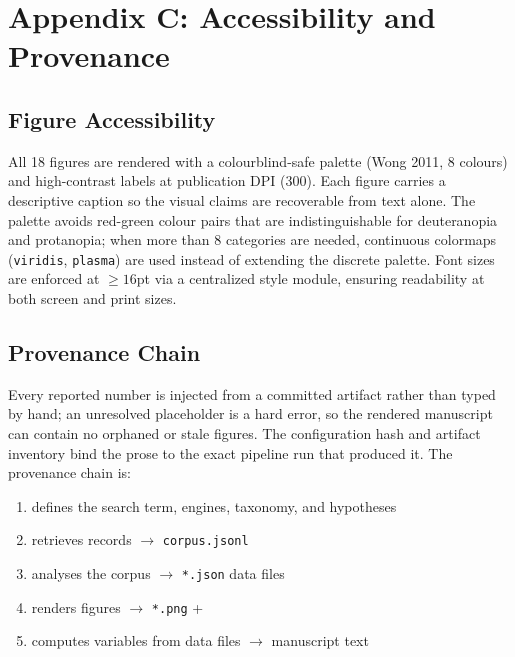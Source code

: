 \documentclass[
  english,
]{article}
\providecommand{\tightlist}{%
  \setlength{\itemsep}{0pt}\setlength{\parskip}{0pt}}
\begin{document}
\newpage

\section{Appendix C: Accessibility and
Provenance}\label{appendix-c-accessibility-and-provenance}

\subsection{Figure Accessibility}\label{figure-accessibility}

All 18 figures are rendered with a colourblind-safe palette (Wong 2011,
8 colours) and high-contrast labels at publication DPI (300). Each
figure carries a descriptive caption so the visual claims are
recoverable from text alone. The palette avoids red-green colour pairs
that are indistinguishable for deuteranopia and protanopia; when more
than 8 categories are needed, continuous colormaps (\texttt{viridis},
\texttt{plasma}) are used instead of extending the discrete palette.
Font sizes are enforced at \(\geq 16\)pt via a centralized style module,
ensuring readability at both screen and print sizes.

\subsection{Provenance Chain}\label{provenance-chain}

Every reported number is injected from a committed artifact rather than
typed by hand; an unresolved placeholder is a hard error, so the
rendered manuscript can contain no orphaned or stale figures. The
configuration hash and artifact inventory bind the prose to the exact
pipeline run that produced it. The provenance chain is:

\begin{enumerate}
\def\labelenumi{\arabic{enumi}.}
\tightlist
\item
   defines the search term, engines,
  taxonomy, and hypotheses
\item
   retrieves records \texorpdfstring{\ensuremath{\to}}{->}
  \texttt{corpus.jsonl}
\item
   analyses the corpus \texorpdfstring{\ensuremath{\to}}{->}
  \texttt{*.json} data files
\item
   renders figures \texorpdfstring{\ensuremath{\to}}{->}
  \texttt{*.png} + 
\item
   computes variables from data
  files \texorpdfstring{\ensuremath{\to}}{->} manuscript text
\end{enumerate}
\end{document}

